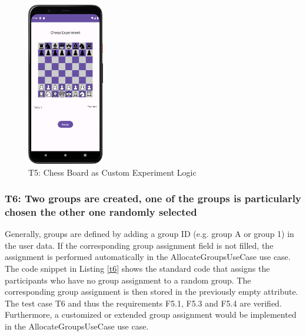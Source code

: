 \begin{figure}[htbp]
    \centering
    \includegraphics[width=0.3\textwidth, keepaspectratio]{content/07_evaluation_of_the_solution/Screenshot_Chess.png}
    \caption{T5: Chess Board as Custom Experiment Logic}    
    \label{fig:chess}
\end{figure}

\newpage

\subsubsection*{T6: Two groups are created, one of the groups is particularly chosen the other one randomly selected}

Generally, groups are defined by adding a group ID (e.g. group A or group 1) in the user data. If the corresponding group assignment field is not filled, the assignment is performed automatically in the AllocateGroupsUseCase use case. The code snippet in Listing \ref{t6} shows the standard code that assigns the participants who have no group assignment to a random group. The corresponding group assignment is then stored in the previously empty attribute. The test case T6 and thus the requirements F5.1, F5.3 and F5.4 are verified. Furthermore, a customized or extended group assignment would be implemented in the AllocateGroupsUseCase use case.

\vspace{0.5cm}

